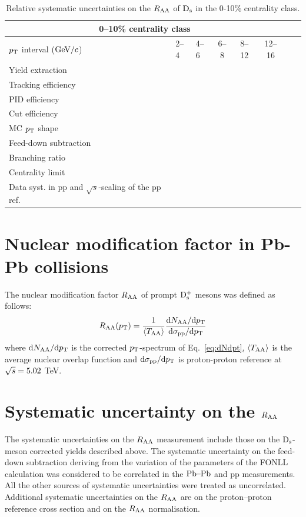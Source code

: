 \begin{table}[!h]
\centering
\begin{tabular}{|l|l|l|c|c|c|c|c|}
\hline
\multicolumn{6}{|c|}{0--10\% centrality class}       \\                                                                                                                                                                                                                                               \hline
$p_{\rm T}$ interval ($\mathrm{GeV}/c$)           & 2--4        &    4--6          & 6--8      &   8--12            & 12--16                  \\ 
Yield extraction & & & & & \\
Tracking efficiency & & & & & \\
PID efficiency & & & & & \\
Cut efficiency & & & & & \\
MC $p_{\rm T}$ shape & & & & & \\
Feed-down subtraction & & & & & \\
Branching ratio & & & & & \\
Centrality limit & & & & & \\
Data syst. in pp and $\sqrt s$-scaling of the pp ref. & & & & & \\
\hline
\end{tabular}
\caption{Relative systematic uncertainties on the $R_{\rm AA}$ of ${\rm D_s}$ in the 0-10\% centrality class.}
\label{tab:sysunc_yieldtable}
\end{table}

\section{Nuclear modification factor in Pb-Pb collisions}
\label{sec:RAA}
The nuclear modification factor $R_{\rm AA}$ of prompt ${\rm D_s^+}$ mesons was defined as follows:
\begin{equation}
\label{eq:RAADs}
R_{\rm AA} (p_{\rm T}) = \frac{1}{\langle T_{\rm AA} \rangle} \frac{{\rm d} N_{\rm AA}/{\rm d}p_{\rm T}}{{\rm d} \sigma_{\rm pp}/{\rm d} p_{\rm T}}
\end{equation}
where ${\rm d} N_{\rm AA}/{\rm d}p_{\rm T}$ is the corrected $p_{\rm T}$-spectrum of 
Eq.~\ref{eq:dNdpt}, $\langle T_{\rm AA} \rangle$ is the 
average nuclear overlap function and ${\rm d} \sigma_{\rm pp}/{\rm d} p_{\rm T}$ is 
proton-proton reference at $\sqrt{s} = 5.02$ TeV.
\section{Systematic uncertainty on the $R_{\rm AA}$}
\label{sec:SystRAA}
The systematic uncertainties on the $R_{\rm AA}$ measurement include those 
on the ${\rm D_s}$-meson corrected yields described above. The systematic 
uncertainty on the feed-down subtraction deriving from
the variation of the parameters of the FONLL calculation was considered to be
correlated in the $\mbox{Pb--Pb}$ and pp measurements. All the 
other sources of systematic uncertainties were treated as uncorrelated. 
Additional systematic uncertainties on the $R_{\rm AA}$ are on 
the proton--proton reference cross section and on the $R_{\rm AA}$ normalisation. 

